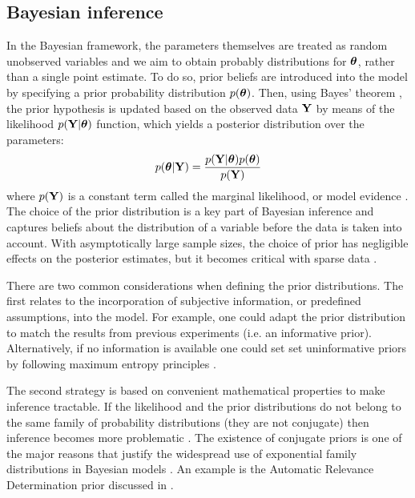 \subsection{Bayesian inference}  \label{section:bayesian_inference}
In the Bayesian framework, the parameters themselves are treated as random unobserved variables and we aim to obtain probably distributions for $\mbox{\boldmath $\theta$}$, rather than a single point estimate. To do so, prior beliefs are introduced into the model by specifying a prior probability distribution $p(\mbox{\boldmath $\theta$})$. Then, using Bayes' theorem \cite{Bayes1763}, the prior hypothesis is updated based on the observed data ${\bf Y}$ by means of the likelihood $p({\bf Y}|\mbox{\boldmath $\theta$})$ function, which yields a posterior distribution over the parameters:
\[
	p(\mbox{\boldmath $\theta$}|{\bf Y}) = \frac{p({\bf Y}|\mbox{\boldmath $\theta$}) p(\mbox{\boldmath $\theta$})}{p({\bf Y})}
\]
where $p({\bf Y})$ is a constant term called the marginal likelihood, or model evidence \cite{Bishop,Murphy}.\\
The choice of the prior distribution is a key part of Bayesian inference and captures beliefs about the distribution of a variable before the data is taken into account. With asymptotically large sample sizes, the choice of prior has negligible effects on the posterior estimates, but it becomes critical with sparse data \cite{Bishop,Murphy,Gelman2013}.

There are two common considerations when defining the prior distributions. The first relates to the incorporation of subjective information, or predefined assumptions, into the model. For example, one could adapt the prior distribution to match the results from previous experiments (i.e. an informative prior). Alternatively, if no information is available one could set set uninformative priors by following maximum entropy principles \cite{Jaynes1968}.

The second strategy is based on convenient mathematical properties to make inference tractable. If the likelihood and the prior distributions do not belong to the same family of probability distributions (they are not conjugate) then inference becomes more problematic \cite{Raiffa1961,Bishop,Murphy,Gelman2013}. The existence of conjugate priors is one of the major reasons that justify the widespread use of exponential family distributions in Bayesian models \cite{Gelman2013}. An example is the Automatic Relevance Determination prior discussed in .

